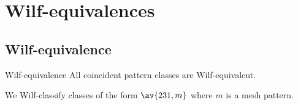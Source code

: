 \section{Wilf-equivalences}
\label{sec:Wilf-equivalences}
\subsection{Wilf-equivalence}
\label{sub:Wilf-equivalence}
\begin{frame}{Wilf-equivalence}
 All coincident pattern classes are Wilf-equivalent.

 We Wilf-classify classes of the form \(\av{231,m}\) where \(m\)
 is a mesh pattern.

\end{frame}
